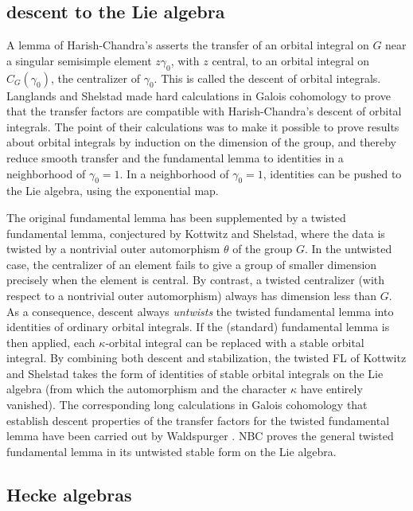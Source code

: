 \documentclass[brochure,english,12pt]{bourbaki}
\begin{document}
\subsection{descent to the Lie algebra}

A lemma of Harish-Chandra's asserts the transfer of an orbital
integral on $G$ near a singular semisimple element $z\gamma_0$, with
$z$ central, to an orbital integral on $C_G(\gamma_0)$, the
centralizer of $\gamma_0$.  This is called the descent of orbital
integrals.  Langlands and Shelstad made hard calculations in
Galois cohomology to prove that the transfer factors are compatible
with Harish-Chandra's descent of orbital integrals.  The point of
their calculations was to make it possible to prove results about
orbital integrals by induction on the dimension of the group, and
thereby reduce smooth transfer and the fundamental lemma to identities
in a neighborhood of $\gamma_0=1$.  In a neighborhood of $\gamma_0=1$,
identities can be pushed to the Lie algebra, using the exponential map.

The original fundamental lemma has been supplemented by a twisted
fundamental lemma, conjectured by Kottwitz and Shelstad, where the
data is twisted by a nontrivial outer automorphism $\theta$ of the
group $G$.  In the untwisted case, the centralizer of an element fails
to give a group of smaller dimension precisely when the element is
central.  By contrast, a twisted centralizer (with respect to a
nontrivial outer automorphism) always has dimension less than $G$.  As
a consequence, descent always {\it untwists} the twisted fundamental
lemma into identities of ordinary orbital integrals.  If the
(standard) fundamental lemma is then applied, each $\kappa$-orbital
integral can be replaced with a stable orbital integral.  By combining both
descent and stabilization, the twisted FL of Kottwitz and Shelstad
takes the form of identities of stable orbital integrals on the Lie
algebra (from which the automorphism and the character $\kappa$ have
entirely vanished).  The corresponding long calculations in Galois
cohomology that establish descent properties of the transfer factors
for the twisted fundamental lemma have been carried out by
Waldspurger \cite{twisted-w}.  NBC proves the general twisted fundamental lemma in
its untwisted stable form on the Lie algebra.



\subsection{Hecke algebras}
\end{document}
